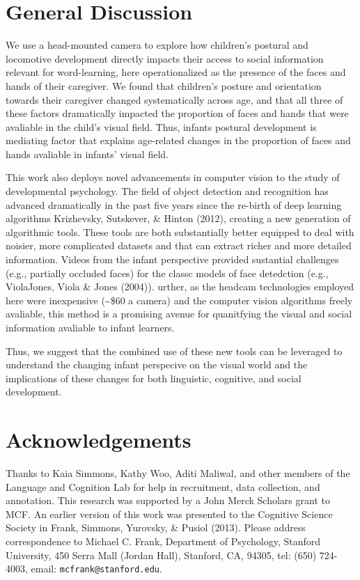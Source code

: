 \documentclass[10pt, letterpaper]{article}
\begin{document}
\section{General Discussion}\label{general-discussion}

We use a head-mounted camera to explore how children's postural and
locomotive development directly impacts their access to social
information relevant for word-learning, here operationalized as the
presence of the faces and hands of their caregiver. We found that
children's posture and orientation towards their caregiver changed
systematically across age, and that all three of these factors
dramatically impacted the proportion of faces and hands that were
avaliable in the child's visual field. Thus, infants postural
development is mediating factor that explains age-related changes in the
proportion of faces and hands avaliable in infants' visual field.

This work also deploys novel advancements in computer vision to the
study of developmental psychology. The field of object detection and
recognition has advanced dramatically in the past five years since the
re-birth of deep learning algorithms Krizhevsky, Sutskever, \& Hinton
(2012), creating a new generation of algorithmic tools. These tools are
both substantially better equipped to deal with noisier, more
complicated datasets and that can extract richer and more detailed
information. Videos from the infant perspective provided sustantial
challenges (e.g., partially occluded faces) for the classc models of
face detedction (e.g., ViolaJones, Viola \& Jones (2004)). urther, as
the headcam technologies employed here were inexpensive
(\textasciitilde{}\$60 a camera) and the computer vision algorithms
freely avaliable, this method is a promising avenue for quanitfying the
visual and social information avaliable to infant learners.

Thus, we suggest that the combined use of these new tools can be
leveraged to understand the changing infant perspecive on the visual
world and the implications of these changes for both linguistic,
cognitive, and social development.

\section{Acknowledgements}\label{acknowledgements}

Thanks to Kaia Simmons, Kathy Woo, Aditi Maliwal, and other members of
the Language and Cognition Lab for help in recruitment, data collection,
and annotation. This research was supported by a John Merck Scholars
grant to MCF. An earlier version of this work was presented to the
Cognitive Science Society in Frank, Simmons, Yurovsky, \& Pusiol (2013).
Please address correspondence to Michael C. Frank, Department of
Psychology, Stanford University, 450 Serra Mall (Jordan Hall), Stanford,
CA, 94305, tel: (650) 724-4003, email: \texttt{mcfrank@stanford.edu}.
\end{document}
